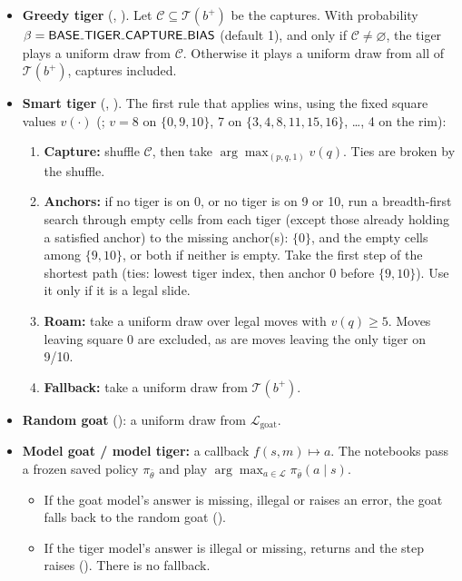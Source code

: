 \begin{itemize}
\item \textbf{Greedy tiger} (, ). Let $\mathcal{C} \subseteq \mathcal{T}(b^+)$ be the captures. With probability $\beta = \knob{BASE\_TIGER\_CAPTURE\_BIAS}$ (default 1), and only if $\mathcal{C} \neq \varnothing$, the tiger plays a uniform draw from $\mathcal{C}$. Otherwise it plays a uniform draw from all of $\mathcal{T}(b^+)$, captures included.
\item \textbf{Smart tiger} (, ). The first rule that applies wins, using the fixed square values $v(\cdot)$ (; $v = 8$ on $\{0, 9, 10\}$, 7 on $\{3, 4, 8, 11, 15, 16\}$, …, 4 on the rim):
\begin{enumerate}
\item \textbf{Capture:} shuffle $\mathcal{C}$, then take $\arg\max_{(p,q,1)} v(q)$. Ties are broken by the shuffle.
\item \textbf{Anchors:} if no tiger is on 0, or no tiger is on 9 or 10, run a breadth-first search through empty cells from each tiger (except those already holding a satisfied anchor) to the missing anchor(s): $\{0\}$, and the empty cells among $\{9, 10\}$, or both if neither is empty. Take the first step of the shortest path (ties: lowest tiger index, then anchor 0 before $\{9,10\}$). Use it only if it is a legal slide.
\item \textbf{Roam:} take a uniform draw over legal moves with $v(q) \geq 5$. Moves leaving square 0 are excluded, as are moves leaving the only tiger on 9/10.
\item \textbf{Fallback:} take a uniform draw from $\mathcal{T}(b^+)$.
\end{enumerate}
\item \textbf{Random goat} (): a uniform draw from $\mathcal{L}_{\text{goat}}$.
\item \textbf{Model goat / model tiger:} a callback $f(s, m) \mapsto a$. The notebooks pass a frozen saved policy $\pi_{\bar\theta}$ and play $\arg\max_{a \in \mathcal{L}} \pi_{\bar\theta}(a \mid s)$.
\begin{itemize}
\item If the goat model's answer is missing, illegal or raises an error, the goat falls back to the random goat ().
\item If the tiger model's answer is illegal or missing,  returns  and the step raises  (). There is no fallback.
\end{itemize}
\end{itemize}
